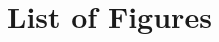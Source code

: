 \documentclass[conf]{new-aiaa}
\begin{document}
{\begin{longtable*}{@{}l @{\quad=\quad} l@{}}
\end{longtable*}}

\newpage
\section{List of Figures}
\end{document}
